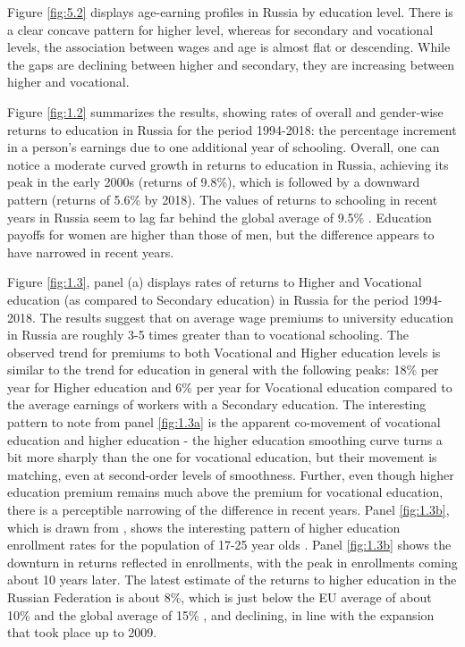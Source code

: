 \documentclass[alpha-refs]{wiley-article-01g}
\begin{document}

Figure \ref{fig:5.2} displays age-earning profiles in Russia by education level. There is a clear concave pattern for higher level, whereas for secondary and vocational levels, the association between wages and age is almost flat or descending. While the gaps are declining between higher and secondary, they are increasing between higher and vocational. 

Figure \ref{fig:1.2} summarizes the results, showing rates of overall and gender-wise returns to education in Russia for the period 1994-2018: the percentage increment in a person's earnings due to one additional year of schooling. Overall, one can notice a moderate curved growth in returns to education in Russia, achieving its peak in the early 2000s (returns of 9.8\%), which is followed by a downward pattern (returns of 5.6\% by 2018). The values of returns to schooling in recent years in Russia seem to lag far behind the global average of 9.5\% \parencite{Psacharopoulos_Patrinos2018}. Education payoffs for women are higher than those of men, but the difference appears to have narrowed in recent years.

Figure \ref{fig:1.3}, panel (a) displays rates of returns to Higher and 
Vocational education (as compared to Secondary education) in Russia for the 
period 1994-2018. The results suggest that on average wage premiums to 
university education in Russia are roughly 3-5 times greater than to 
vocational schooling. The observed trend for premiums to both Vocational 
and Higher education levels is similar to the trend for education in 
general with the following peaks: 18\% per year for Higher education and 
6\% per year for Vocational education compared to the average earnings of 
workers with a Secondary education. The interesting pattern to note from 
panel \ref{fig:1.3a} is the apparent co-movement of vocational education 
and higher education - the higher education smoothing curve turns a bit 
more sharply than the one for vocational education, but their movement is 
matching, even at second-order levels of smoothness. Further, even though 
higher education premium remains much above the premium for vocational 
education, there is a perceptible narrowing of the difference in recent 
years. Panel \ref{fig:1.3b}, which is drawn from \cite{Telezhkina2019}, 
shows the interesting pattern of higher education enrollment rates for the 
population of 17-25 year olds . Panel \ref{fig:1.3b} shows the downturn in 
returns reflected in enrollments, with the peak in enrollments coming about 
10 years later. The latest estimate of the returns to higher education in 
the Russian Federation is about 8\%, which is just below the EU average of 
about 10\% and the global average of 15\% 
\parencite{Psacharopoulos_Patrinos2018}, and declining, in line with the 
expansion that took place up to 2009. 
\end{document}

